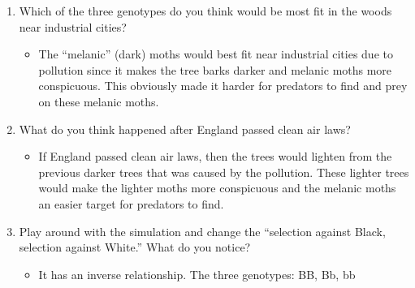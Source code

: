 \documentclass{article}
\begin{document}
\begin{enumerate}
\begin{itemize}
  \end{itemize}
  \item Which of the three genotypes do you think would be most fit in the woods near industrial cities?
  \begin{itemize}
    \item The ``melanic'' (dark) moths would best fit near industrial cities due to pollution since it makes the tree barks darker and melanic moths more conspicuous. This obviously made it harder for predators to find and prey on these melanic moths.
  \end{itemize}
  \item What do you think happened after England passed clean air laws?
  \begin{itemize}
    \item If England passed clean air laws, then the trees would lighten from the previous darker trees that was caused by the pollution. These lighter trees would make the lighter moths more conspicuous and the melanic moths an easier target for predators to find.
  \end{itemize}
  \item Play around with the simulation and change the ``selection against Black, selection against White.'' What do you notice?
  \begin{itemize}
    \item It has an inverse relationship. The three genotypes: BB, Bb, bb
  \end{itemize}
\end{enumerate}
\end{document}

